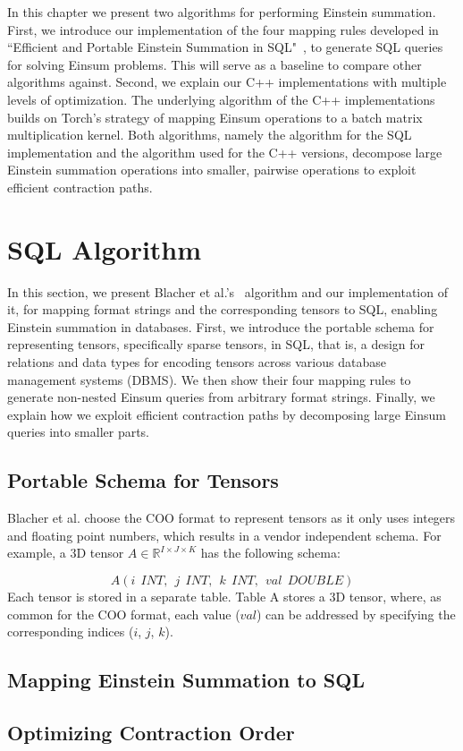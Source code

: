 In this chapter we present two algorithms for performing Einstein summation. First,
we introduce our implementation of the four mapping rules developed in ``Efficient and Portable
Einstein Summation in SQL"~\cite{sql_einsum}, to generate SQL queries for solving Einsum problems.
This will serve as a baseline to compare other algorithms against. Second, we explain our C++
implementations with multiple levels of optimization. The underlying algorithm of the C++ 
implementations builds on Torch's strategy of mapping Einsum operations to a batch matrix 
multiplication kernel. Both algorithms, namely the algorithm for the SQL implementation and 
the algorithm used for the C++ versions, decompose large Einstein summation operations
into smaller, pairwise operations to exploit efficient contraction paths.

\section{SQL Algorithm}
In this section, we present Blacher et al.'s~\cite{sql_einsum} algorithm and our implementation 
of it, for mapping format strings and the corresponding tensors to SQL, enabling Einstein 
summation in databases. First, we introduce the portable schema for representing tensors, 
specifically sparse tensors, in SQL, that is, a design for relations and data types for 
encoding tensors across various database management systems (DBMS). We then show their four 
mapping rules to generate non-nested Einsum queries from arbitrary format strings. Finally, 
we explain how we exploit efficient contraction paths by decomposing large Einsum queries 
into smaller parts.

\subsection{Portable Schema for Tensors}
Blacher et al. choose the COO format to represent tensors as it only uses integers and 
floating point numbers, which results in a vendor independent schema. For example, a 3D 
tensor $A \in \mathbb{R}^{I \times J \times K}$ has the following schema:

\[
    A(i\ \ INT,\ \ j\ \ INT,\ \ k\ \ INT,\ \ val\ \ DOUBLE)
\]
%
Each tensor is stored in a separate table. Table A stores a 3D tensor, where, as common for 
the COO format, each value ($val$) can be addressed by specifying the corresponding indices 
($i$, $j$, $k$).

\subsection{Mapping Einstein Summation to SQL}

\subsection{Optimizing Contraction Order}
